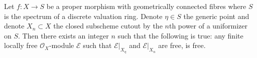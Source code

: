 %
\begin{lemma}
\label{lemma-trivial-fibres-dvr}
Let $f : X \to S$ be a proper morphism with geometrically connected fibres
where $S$ is the spectrum of a discrete valuation ring. Denote $\eta \in S$
the generic point and denote $X_n \subset X$ the closed subscheme
cutout by the $n$th power of a uniformizer on $S$.
Then there exists
an integer $n$ such that the following is true: any finite
locally free $\mathcal{O}_X$-module $\mathcal{E}$
such that $\mathcal{E}|_{X_\eta}$ and $\mathcal{E}|_{X_n}$
are free, is free.
\end{lemma}


